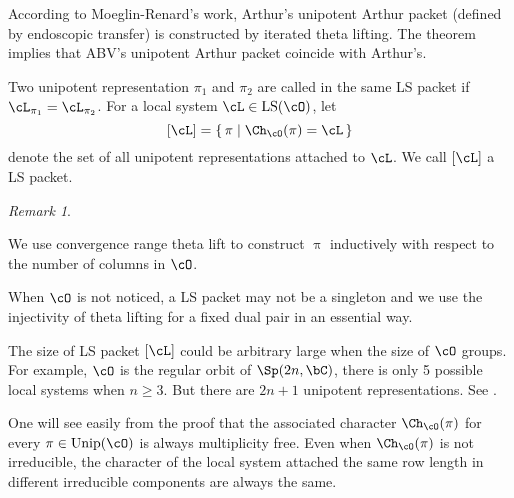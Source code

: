 \documentclass[12pt,a4paper]{amsart}
\numberwithin{equation}{section}
\newtheorem{thm}{Theorem}[section]
\theoremstyle{remark}
\newtheorem*{remark}{Remark}
\def\Thetab{\bar{\Theta}}
\def\drc{\mathrm{DRC}}
\def\LS{\mathrm{LS}}
\def\Unip{\mathrm{Unip}}
\begin{document}


{\color{red} According to Moeglin-Renard's work, Arthur's unipotent Arthur packet
  (defined by endoscopic transfer) is constructed by iterated theta lifting.
  The theorem implies that ABV's unipotent Arthur packet coincide with Arthur's.}


Two unipotent representation $\pi_{1}$ and $\pi_{2}$ are called in the same
LS packet if $\cL_{\pi_{1}} = \cL_{\pi_{2}}$.
For a local system $\cL\in \LS(\cO)$, let
\[
  [\cL] = \set{\pi |\Ch_{\cO}(\pi) = \cL}
\]
denote the set of all unipotent representations attached to $\cL$. We call
$[\cL]$ a  LS packet.

\begin{remark}
  \begin{enumR}
    \item
    We use convergence range theta lift to construct $\uppi$ inductively with
    respect to the number of columns in $\cO$.
    \item
    When $\cO$ is not noticed, a LS packet may not be a singleton
    and we use the injectivity of theta lifting for a fixed dual pair in an essential way.
    \item
    The size of LS packet $[\cL]$ could be arbitrary large  when the size of $\cO$
    groups.
    For example, $\cO$ is the regular orbit of $\Sp(2n,\bC)$, there is only 5 possible
    local systems when $n\geq 3$. But there are $2n+1$ unipotent
    representations. See .
    \item One will see easily from the proof that the associated character
    $\Ch_{\cO}(\pi)$ for every $\pi\in \Unip(\cO)$ is always multiplicity free.
    Even when $\Ch_{\cO}(\pi)$ is not irreducible, the character of the local
    system attached the same row length in different irreducible components are
    always the same.
  \end{enumR}
\end{remark}
\end{document}
